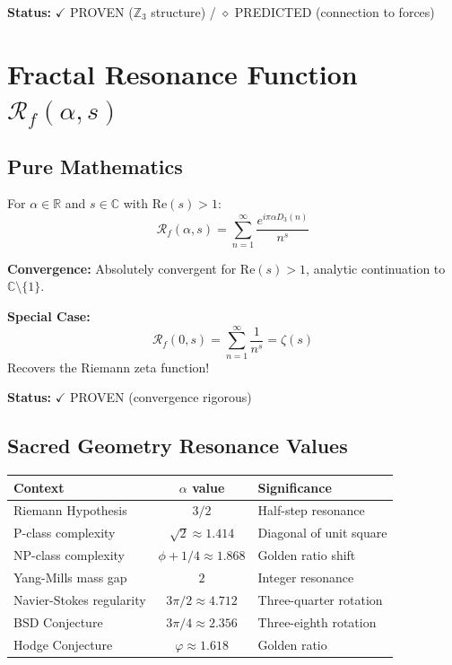 \textbf{Status:} $\checkmark$ PROVEN ($\mathbb{Z}_3$ structure) / $\diamond$ PREDICTED (connection to forces)

\section{Fractal Resonance Function $\mathcal{R}_f(\alpha, s)$}

\subsection{Pure Mathematics}

For $\alpha \in \mathbb{R}$ and $s \in \mathbb{C}$ with $\text{Re}(s) > 1$:
\begin{equation}
\mathcal{R}_f(\alpha, s) = \sum_{n=1}^{\infty} \frac{e^{i\pi\alpha D_3(n)}}{n^s}
\end{equation}

\textbf{Convergence:} Absolutely convergent for $\text{Re}(s) > 1$, analytic continuation to $\mathbb{C} \setminus \{1\}$.

\textbf{Special Case:}
\begin{equation}
\mathcal{R}_f(0, s) = \sum_{n=1}^{\infty} \frac{1}{n^s} = \zeta(s)
\end{equation}
Recovers the Riemann zeta function!

\textbf{Status:} $\checkmark$ PROVEN (convergence rigorous)

\subsection{Sacred Geometry Resonance Values}

\begin{center}
\begin{tabular}{|l|c|l|}
\hline
\textbf{Context} & \textbf{$\alpha$ value} & \textbf{Significance} \\
\hline
Riemann Hypothesis & $3/2$ & Half-step resonance \\
P-class complexity & $\sqrt{2} \approx 1.414$ & Diagonal of unit square \\
NP-class complexity & $\phi + 1/4 \approx 1.868$ & Golden ratio shift \\
Yang-Mills mass gap & $2$ & Integer resonance \\
Navier-Stokes regularity & $3\pi/2 \approx 4.712$ & Three-quarter rotation \\
BSD Conjecture & $3\pi/4 \approx 2.356$ & Three-eighth rotation \\
Hodge Conjecture & $\varphi \approx 1.618$ & Golden ratio \\
\hline
\end{tabular}
\end{center}

